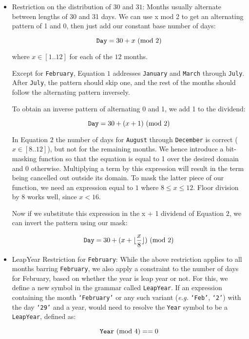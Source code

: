 \begin{itemize}
\item Restriction on the distribution of $30$ and $31$:
Months usually alternate between lengths of 30 and 31 days. We can use x mod 2 to get an alternating pattern of 1 and 0, then just add our constant base number of days:

\begin{equation}
\texttt{Day} = 30 + x \ (\text{mod}\ 2)
\end{equation}

where $x \in [1..12]$ for each of the $12$ months.

Except for \texttt{February}, Equation $1$ addresses \texttt{January} and \texttt{March} through \texttt{July}. After \texttt{July}, the pattern should skip one, and the rest of the months should follow the alternating pattern inversely.

To obtain an inverse pattern of alternating 0 and 1, we add 1 to the dividend:

\begin{equation}
\texttt{Day} = 30 + (x + 1) \ (\text{mod}\ 2)
\end{equation}

In Equation $2$ the number of days for \texttt{August} through \texttt{December} is correct ($x \in [8..12]$), but not for the remaining months. We hence introduce a bit-masking function so that the equation is equal to 1 over the desired domain and 0 otherwise. Multiplying a term by this expression will result in the term being cancelled out outside its domain. To mask the latter piece of our function, we need an expression equal to $1$ where $8 \le x\le 12$. Floor division by 8 works well, since $x < 16$.

Now if we substitute this expression in the x + 1 dividend of Equation $2$, we can invert the pattern using our mask:

\begin{equation}
\texttt{Day} = 30 + (x + \lfloor\frac{x}{8}\rfloor) \ (\text{mod}\ 2)
\end{equation}


\item LeapYear Restriction for \texttt{February}:
While the above restriction applies to all months barring \texttt{February}, we also apply a constraint to the number of days for February, based on whether the year is leap year or not. For this, we define a new symbol in the grammar called \texttt{LeapYear}. If an expression containing the month \texttt{`February'} or any such variant (\textit{e.g.} \texttt{`Feb'}, \texttt{`2'}) with the day \texttt{`29'} and a year, would need to resolve the \texttt{Year} symbol to be a \texttt{LeapYear}, defined as:

\begin{equation}
\texttt{Year} \ (\text{mod}\ 4) == 0
\end{equation}

\end{itemize}

